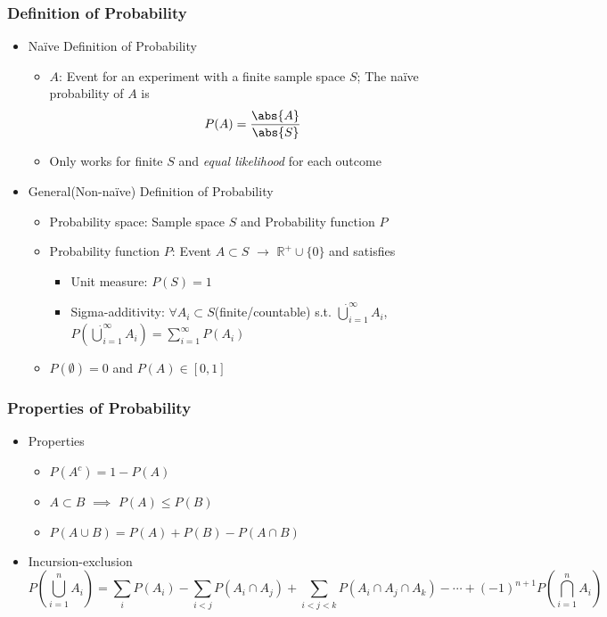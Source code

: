 \subsubsection*{Definition of Probability}
\begin{itemize}
    \item Na\"ive Definition of Probability
    \begin{itemize}
        \item $A$: Event for an experiment with a finite sample space $S$; The na\"ive probability of $A$ is
        \begin{equation}
            P(A)=\frac{\abs{A}}{\abs{S}}
        \end{equation}
        \item Only works for finite $S$ and \textit{equal likelihood} for each outcome
    \end{itemize}
    \item General(Non-na\"ive) Definition of Probability
    \begin{itemize}
        \item Probability space: Sample space $S$ and Probability function $P$
        \item Probability function $P$: Event $A\subset S$ $\to$ $\mathbb{R}^+\cup\{0\}$ and satisfies
        \begin{itemize}
            \item Unit measure: $P(S)=1$
            \item Sigma-additivity: $\forall A_i\subset S$(finite/countable) s.t. $\dot\bigcup_{i=1}^\infty A_i$, $P\left(\dot\bigcup_{i=1}^\infty A_i\right)=\sum_{i=1}^\infty P(A_i)$
        \end{itemize}
        \item $P(\emptyset)=0$ and $P(A)\in[0,1]$
    \end{itemize}
\end{itemize}

\subsubsection*{Properties of Probability}
\begin{itemize}
    \item Properties
    \begin{itemize}
        \item $P(A^c)=1-P(A)$
        \item $A\subset B$ $\implies$ $P(A)\leq P(B)$
        \item $P(A\cup B)=P(A)+P(B)-P(A\cap B)$
    \end{itemize}
    \item Incursion-exclusion
    \begin{equation}
        P\left(\bigcup_{i=1}^nA_i\right)=\sum_iP(A_i)-\sum_{i<j}P(A_i\cap A_j)+\sum_{i<j<k}P(A_i\cap A_j\cap A_k)-\cdots+(-1)^{n+1}P\left(\bigcap_{i=1}^nA_i\right)
    \end{equation}
\end{itemize}
